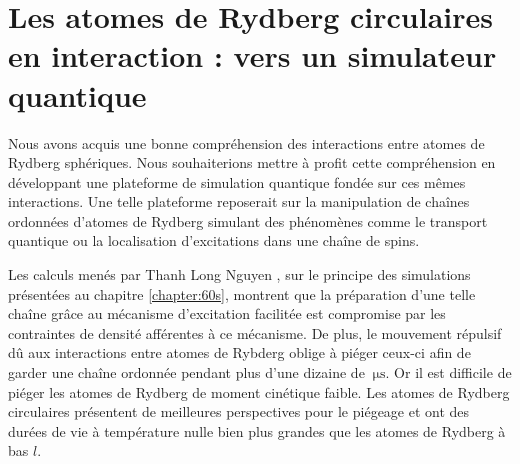 \chapter{Les atomes de Rydberg circulaires en interaction : vers un simulateur quantique}
\label{chapter:circsim}

\newcommand{\CnCnC}{C_{\mathrm{nC},\mathrm{nC}}}
\newcommand{\CnpCnpC}{C_{\mathrm{n'C},\mathrm{n'C}}}
\newcommand{\CnCnpC}{C_{\mathrm{nC},\mathrm{n'C}}}
\newcommand{\AnCnpC}{A_{\mathrm{nC},\mathrm{n'C}}}

\vfill
\minitoc
\newpage

\noindent Nous avons acquis une bonne compréhension des interactions entre atomes de Rydberg sphériques.
Nous souhaiterions mettre à profit cette compréhension en développant une plateforme de simulation quantique fondée sur ces mêmes interactions.
Une telle plateforme reposerait sur la manipulation de chaînes ordonnées d'atomes de Rydberg simulant des phénomènes comme le transport quantique ou la localisation d'excitations dans une chaîne de spins.

Les calculs menés par Thanh Long Nguyen \cite{PHD_NGUYEN}, sur le principe des simulations présentées au chapitre \ref{chapter:60s}, montrent que la préparation d'une telle chaîne grâce au mécanisme d'excitation facilitée est compromise par les contraintes de densité afférentes à ce mécanisme.
De plus, le mouvement répulsif dû aux interactions entre atomes de Rybderg oblige à piéger ceux-ci afin de garder une chaîne ordonnée pendant plus d'une dizaine de $\SI{}{\us}$.
Or il est difficile de piéger les atomes de Rydberg de moment cinétique faible.
Les atomes de Rydberg circulaires présentent de meilleures perspectives pour le piégeage et ont des durées de vie à température nulle bien plus grandes que les atomes de Rydberg à bas $l$.

